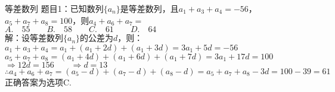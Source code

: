 \documentclass[aspectratio=169]{ctexbeamer} %
\date{\today}
\begin{document}
\begin{frame}[t]{等差数列}
题目1：已知数列$\{a_n\}$是等差数列，且$a_1 + a_3 + a_4 = -56$，$a_5 + a_7 + a_8 = 100$，则$a_4 + a_6 + a_7 = $ \\
$A. \quad 55 \qquad B. \quad 58 \qquad C. \quad 61 \qquad D. \quad 64$ \\

\vspace{0.5cm}
\pause
解：设等差数列$\{a_n\}$的公差为$d$，则：\\
\pause
$a_1 + a_3 + a_4 = a_1 + (a_1 + 2d) + (a_1 + 3d) = 3a_1 + 5d = -56$ \\
$a_5 + a_7 + a_8 = (a_1 + 4d) + (a_1 + 6d) + (a_1 + 7d) = 3a_1 + 17d = 100$ \\
$\Rightarrow 12d = 156 \qquad \Rightarrow d = 13$ \\
$\therefore a_4 + a_6 + a_7 = (a_5 - d) + (a_7 - d) + (a_8 - d) = a_5 + a_7 + a_8 - 3d = 100 - 39 = 61$ \\
\pause
正确答案为选项C.
\end{frame}
\end{document}
